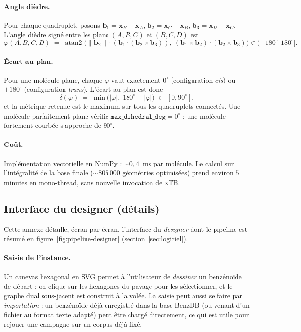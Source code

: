 \documentclass[11pt,a4paper]{article}
\newcommand{\xtb}{\textsc{xTB}}
\begin{document}
\paragraph{Angle dièdre.}
Pour chaque quadruplet, posons
$\mathbf{b}_1 = \mathbf{x}_B - \mathbf{x}_A$,
$\mathbf{b}_2 = \mathbf{x}_C - \mathbf{x}_B$,
$\mathbf{b}_3 = \mathbf{x}_D - \mathbf{x}_C$.
L'angle dièdre signé entre les plans $(A,B,C)$ et $(B,C,D)$ est
\[
  \varphi(A,B,C,D) \;=\; \operatorname{atan2}\bigl(
    \|\mathbf{b}_2\| \cdot (\mathbf{b}_1 \cdot (\mathbf{b}_2 \times \mathbf{b}_3)),
    \;
    (\mathbf{b}_1 \times \mathbf{b}_2) \cdot (\mathbf{b}_2 \times \mathbf{b}_3)
  \bigr) \in (-180^\circ, 180^\circ].
\]

\paragraph{Écart au plan.}
Pour une molécule plane, chaque $\varphi$ vaut exactement
$0^\circ$ (configuration \emph{cis}) ou $\pm 180^\circ$
(configuration \emph{trans}). L'écart au plan est donc
\[
  \delta(\varphi) \;=\; \min\bigl(|\varphi|,\; 180^\circ - |\varphi|\bigr)
  \;\in\; [0, 90^\circ],
\]
et la métrique retenue est le maximum sur tous les quadruplets
connectés. Une molécule parfaitement plane vérifie
$\texttt{max\_dihedral\_deg} = 0^\circ$ ; une molécule fortement
courbée s'approche de $90^\circ$.

\paragraph{Coût.}
Implémentation vectorielle en NumPy : $\sim 0{,}4$~ms par molécule.
Le calcul sur l'intégralité de la base finale ($\sim 805\,000$
géométries optimisées) prend environ $5$ minutes en mono-thread, sans
nouvelle invocation de \xtb{}.

\subsection{Interface du designer (détails)}
\label{app:designer}

Cette annexe détaille, écran par écran, l'interface du \emph{designer}
dont le pipeline est résumé en figure~\ref{fig:pipeline-designer}
(section~\ref{sec:logiciel}).

\paragraph{Saisie de l'instance.}
Un canevas hexagonal en SVG permet à l'utilisateur de \emph{dessiner} un
benzénoïde de départ : on clique sur les hexagones du pavage pour les
sélectionner, et le graphe dual sous-jacent est construit à la volée.
La saisie peut aussi se faire par \emph{importation} : un benzénoïde
déjà enregistré dans la base BenzDB (ou venant d'un fichier au format
texte adapté) peut être chargé directement, ce qui est utile pour
rejouer une campagne sur un corpus déjà fixé.
\end{document}
